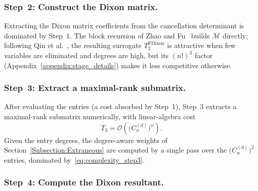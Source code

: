 \subsubsection{Step~2: Construct the Dixon matrix.}
Extracting the Dixon matrix coefficients from the cancellation determinant is dominated by Step~1. The block recursion of Zhao and Fu~\cite{Zhao2005extfast} builds $\mathcal{M}$ directly; following Qin et al.~\cite{DBLP:journals/ijcm/QinWTJ17}, the resulting surrogate $T_{2}^{\mathrm{FDixon}}$ is attractive when few variables are eliminated and degrees are high, but its $(n!)^3$ factor (Appendix~\ref{appendix:stage_details}) makes it less competitive otherwise.

\subsubsection{Step~3: Extract a maximal-rank submatrix.}
After evaluating the entries (a cost absorbed by Step~1), Step~3 extracts a maximal-rank submatrix numerically, with linear-algebra cost
\begin{equation}
	T_3 = \mathcal{O}\!\left(\bigl(C_n^{(d)}\bigr)^{\omega}\right).
	\label{eq:complexity_step3}
\end{equation}
Given the entry degrees, the degree-aware weights of Section~\ref{Subsection:Extraneous} are computed by a single pass over the $\bigl(C_n^{(d)}\bigr)^2$ entries, dominated by~\eqref{eq:complexity_step3}.

\subsubsection{Step~4: Compute the Dixon resultant.}

